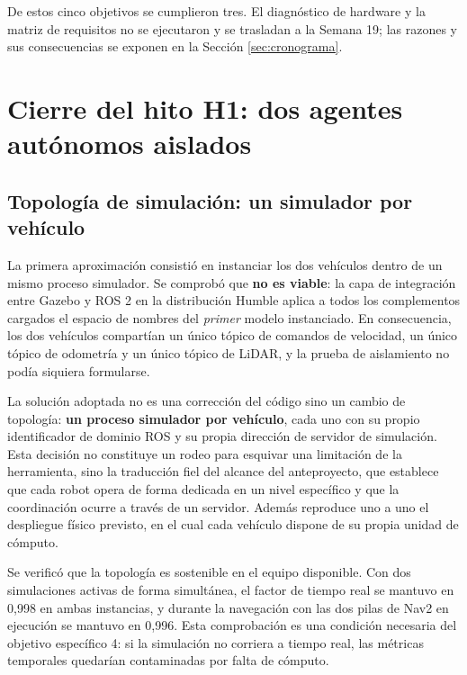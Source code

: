 \documentclass[12pt,letterpaper]{article}
\begin{document}
De estos cinco objetivos se cumplieron tres. El diagnóstico de hardware y la matriz de requisitos no se ejecutaron y se trasladan a la Semana 19; las razones y sus consecuencias se exponen en la Sección \ref{sec:cronograma}.

\section{Cierre del hito H1: dos agentes autónomos aislados}

\subsection{Topología de simulación: un simulador por vehículo}

La primera aproximación consistió en instanciar los dos vehículos dentro de un mismo proceso simulador. Se comprobó que \textbf{no es viable}: la capa de integración entre Gazebo y ROS 2 en la distribución Humble aplica a todos los complementos cargados el espacio de nombres del \emph{primer} modelo instanciado. En consecuencia, los dos vehículos compartían un único tópico de comandos de velocidad, un único tópico de odometría y un único tópico de LiDAR, y la prueba de aislamiento no podía siquiera formularse.

La solución adoptada no es una corrección del código sino un cambio de topología: \textbf{un proceso simulador por vehículo}, cada uno con su propio identificador de dominio ROS y su propia dirección de servidor de simulación. Esta decisión no constituye un rodeo para esquivar una limitación de la herramienta, sino la traducción fiel del alcance del anteproyecto, que establece que cada robot opera de forma dedicada en un nivel específico y que la coordinación ocurre a través de un servidor. Además reproduce uno a uno el despliegue físico previsto, en el cual cada vehículo dispone de su propia unidad de cómputo.

Se verificó que la topología es sostenible en el equipo disponible. Con dos simulaciones activas de forma simultánea, el factor de tiempo real se mantuvo en 0,998 en ambas instancias, y durante la navegación con las dos pilas de Nav2 en ejecución se mantuvo en 0,996. Esta comprobación es una condición necesaria del objetivo específico 4: si la simulación no corriera a tiempo real, las métricas temporales quedarían contaminadas por falta de cómputo.
\end{document}

